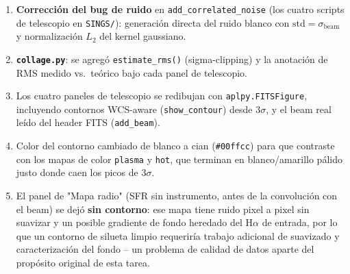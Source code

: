 \documentclass[12pt, a4paper]{article}
\begin{document}
\begin{enumerate}
    \item \textbf{Corrección del bug de ruido} en \texttt{add\_correlated\_noise}
          (los cuatro scripts de telescopio en \texttt{SINGS/}): generación
          directa del ruido blanco con $\mathrm{std}=\sigma_{\mathrm{beam}}$
          y normalización $L_2$ del kernel gaussiano.
    \item \textbf{\texttt{collage.py}}: se agregó \texttt{estimate\_rms()}
          (sigma-clipping) y la anotación de RMS medido vs.\ teórico bajo
          cada panel de telescopio.
    \item Los cuatro paneles de telescopio se redibujan con
          \texttt{aplpy.FITSFigure}, incluyendo contornos WCS-aware
          (\texttt{show\_contour}) desde $3\sigma$, y el beam real leído del
          header FITS (\texttt{add\_beam}).
    \item Color del contorno cambiado de blanco a cian
          (\texttt{\#00ffcc}) para que contraste con los mapas de color
          \texttt{plasma} y \texttt{hot}, que terminan en blanco/amarillo
          pálido justo donde caen los picos de $3\sigma$.
    \item El panel de "Mapa radio" (SFR sin instrumento, antes de la
          convolución con el beam) se dejó \textbf{sin contorno}: ese mapa
          tiene ruido pixel a pixel sin suavizar y un posible gradiente de
          fondo heredado del H$\alpha$ de entrada, por lo que un contorno de
          silueta limpio requeriría trabajo adicional de suavizado y
          caracterización del fondo -- un problema de calidad de datos
          aparte del propósito original de esta tarea.
\end{enumerate}
\end{document}
